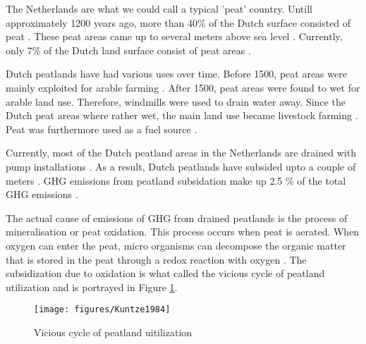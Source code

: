 \documentclass[12pt,a4paper,titlepage]{article}
\begin{document}

The Netherlands are what we could call a typical 'peat' country. Untill approximately 1200 years ago, more than 40\% of the Dutch surface consisted of peat \citep{vos2015origin, de2008vergeten}. These peat areas came up to several meters above sea level \citep{de2008vergeten}. Currently, only 7\% of the Dutch land surface consist of peat areas \citep{de2004verbreiding}. 

Dutch peatlands have had various uses over time. Before 1500, peat areas were mainly exploited for arable farming \citep{ettema2005boeren}. After 1500, peat areas were found to wet for arable land use. Therefore, windmills were used to drain water away. Since the Dutch peat areas where rather wet, the main land use became livestock farming \citep{brouns2016effects}. Peat was furthermore used as a fuel source \citep{van1996turfwinning}.


Currently, most of the Dutch peatland areas in the Netherlands are drained with pump installations \citep{brouns2016effects}. As a result, Dutch peatlands have subsided upto a couple of meters \citep{de2008vergeten}. GHG emissions from peatland subsidation make up 2.5 \% of the total GHG emissions \citep{van2010emission}. 

The actual cause of emissions of GHG from drained peatlands is the process of mineralisation or peat oxidation. This process occurs when peat is aerated. When oxygen can enter the peat, micro organisms can decompose the organic matter that is stored in the peat through a redox reaction with oxygen \citep{erkens2016double}. The subsidization due to oxidation is what \citet{kuntze1984bewirtschaftung} called the vicious cycle of peatland utilization and is portrayed in Figure \ref{fig:peatlanduti}.

\begin{figure}
    \centering
    \texttt{[image: figures/Kuntze1984]} 
    \caption{Vicious cycle of peatland uitilization}
    \label{fig:peatlanduti}
\end{figure}

\end{document}
